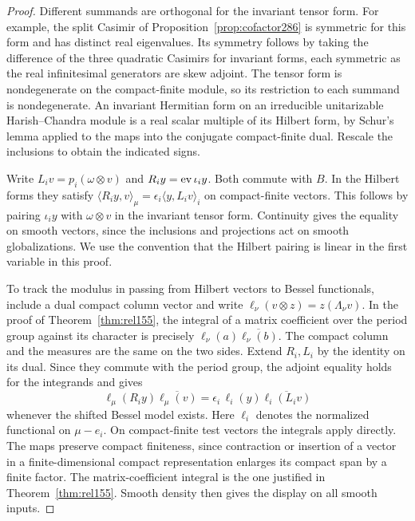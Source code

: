 \documentclass[a4paper,11pt]{article}
\theoremstyle{definition}
\theoremstyle{remark}
\numberwithin{equation}{section}
\begin{document}
\begin{proof}
Different summands are orthogonal for the invariant tensor
form. For example, the split Casimir of
Proposition~\ref{prop:cofactor286} is symmetric for this form
and has distinct real eigenvalues. Its symmetry follows by
taking the difference of the three quadratic Casimirs for
invariant forms, each symmetric as the real infinitesimal
generators are skew adjoint. The tensor form is nondegenerate
on the compact-finite module, so its restriction to each
summand is nondegenerate. An invariant Hermitian form on an
irreducible unitarizable Harish--Chandra module is a real
scalar multiple of its Hilbert form, by Schur's lemma applied
to the maps into the conjugate compact-finite dual. Rescale
the inclusions to obtain the indicated signs.

Write \(L_i v=p_i(\omega\otimes v)\) and \(R_i y={\rm ev}\,\iota_i y\).
Both commute with \(B\). In the Hilbert forms they satisfy
\(\langle R_i y,v\rangle_\mu=\epsilon_i\langle y,L_i v\rangle_i\)
on compact-finite vectors. This follows by pairing \(\iota_i y\)
with \(\omega\otimes v\) in the invariant tensor form.
Continuity gives the equality on smooth vectors, since the
inclusions and projections act on smooth globalizations.
We use the convention that the Hilbert pairing is linear in
the first variable in this proof.

To track the modulus in passing from Hilbert vectors to Bessel
functionals, include a dual compact column vector and write
\(\ell_\nu(v\otimes z)=z(\Lambda_\nu v)\). In the proof of
Theorem~\ref{thm:rel155}, the integral of a matrix coefficient
over the period group against its character is precisely
\(\ell_\nu(a)\overline{\ell_\nu(b)}\). The compact column and
the measures are the same on the two sides. Extend \(R_i,L_i\)
by the identity on its dual. Since they commute with the period
group, the adjoint equality holds for the integrands and gives
\[
 \ell_\mu(R_i y)\overline{\ell_\mu(v)}
       =\epsilon_i\,\ell_i(y)\overline{\ell_i(L_i v)}
\]
whenever the shifted Bessel model exists. Here \(\ell_i\)
denotes the normalized functional on \(\mu-e_i\).
On compact-finite test vectors the integrals apply directly.
The maps preserve compact finiteness, since contraction or
insertion of a vector in a finite-dimensional compact
representation enlarges its compact span by a finite factor.
The matrix-coefficient integral is the one justified in
Theorem~\ref{thm:rel155}. Smooth density then gives the
display on all smooth inputs.


\end{proof}
\end{document}
